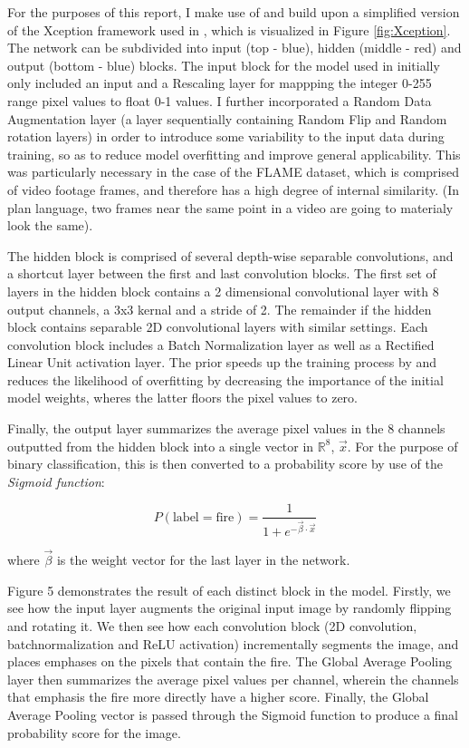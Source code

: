 \documentclass[a4paper,11pt]{article} %
\begin{document}
For the purposes of this report, I make use of and build upon a simplified version of the Xception framework used in \cite{FLAME_dataset}, which is visualized
in Figure \ref{fig:Xception}. The network can be subdivided into input (top - blue), hidden (middle - red) and output (bottom - blue) blocks. The input block for the model used in \cite{FLAME_dataset}
initially only included an input and a Rescaling layer for mappping the integer 0-255 range pixel values to float 0-1 values. I further incorporated a Random Data Augmentation
layer (a layer sequentially containing Random Flip and Random rotation layers) in order to introduce some variability to the input data during training, so as to reduce model overfitting
and improve general applicability. This was particularly necessary in the case of the FLAME dataset, which is comprised of video footage frames, and therefore has a high degree of internal similarity.
(In plan language, two frames near the same point in a video are going to materialy look the same).

\medskip

The hidden block is comprised of several depth-wise separable convolutions, and a shortcut layer between the first and last convolution blocks. The first set of layers in the hidden block
contains a 2 dimensional convolutional layer with 8 output channels, a 3x3 kernal and a stride of 2. The remainder if the hidden block contains separable 2D convolutional layers with similar settings.
Each convolution block includes a Batch Normalization layer as well as a Rectified Linear Unit activation layer. The prior speeds up the training process by and reduces the likelihood of overfitting by
decreasing the importance of the initial model weights, wheres the latter floors the pixel values to zero.

\medskip

Finally, the output layer summarizes the average pixel values in the 8 channels outputted from the hidden block into a single vector in $\mathbb{R}^8$, $\vec{x}$. For the purpose of binary classification,
this is then converted to a probability score by use of the \emph{Sigmoid function}:

\[
    P(\text{label}=\text{fire}) = \frac{1}{1 + e^{-\vec{\beta} \cdot \vec{x}}}
\] 

where $\vec{\beta}$ is the weight vector for the last layer in the network. 

Figure 5 demonstrates the result of each distinct block in the model. Firstly, 
we see how the input layer augments the original input image by randomly flipping and rotating
it. We then see how each convolution block (2D convolution, batchnormalization and ReLU activation)
incrementally segments the image, and places emphases on the pixels that contain the fire. The Global
Average Pooling layer then summarizes the average pixel values per channel, wherein the
channels that emphasis the fire more directly have a higher score. Finally, the Global Average
Pooling vector is passed through the Sigmoid function to produce a final probability score for the
image.
\end{document}
